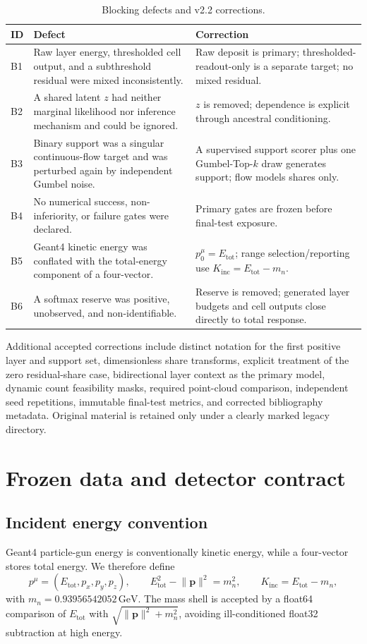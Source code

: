 \documentclass[10pt,a4paper]{article}
\newcommand{\pFour}{p^{\mu}}
\newcommand{\Kinc}{K_{\mathrm{inc}}}
\newcommand{\Etot}{E_{\mathrm{tot}}}
\newcommand{\GeV}{\,\mathrm{GeV}}
\begin{document}
\begin{table}[ht]
\centering
\caption{Blocking defects and v2.2 corrections.}
\label{tab:blockers}
\begin{tabularx}{\textwidth}{@{}p{}Y Y@{}}
\toprule
ID & Defect & Correction \\
\midrule
B1 & Raw layer energy, thresholded cell output, and a subthreshold residual were mixed inconsistently. & Raw deposit is primary; thresholded-readout-only is a separate target; no mixed residual. \\
B2 & A shared latent $z$ had neither marginal likelihood nor inference mechanism and could be ignored. & $z$ is removed; dependence is explicit through ancestral conditioning. \\
B3 & Binary support was a singular continuous-flow target and was perturbed again by independent Gumbel noise. & A supervised support scorer plus one Gumbel-Top-$k$ draw generates support; flow models shares only. \\
B4 & No numerical success, non-inferiority, or failure gates were declared. & Primary gates are frozen before final-test exposure. \\
B5 & Geant4 kinetic energy was conflated with the total-energy component of a four-vector. & $\pFour_0=\Etot$; range selection/reporting use $\Kinc=\Etot-m_n$. \\
B6 & A softmax reserve was positive, unobserved, and non-identifiable. & Reserve is removed; generated layer budgets and cell outputs close directly to total response. \\
\bottomrule
\end{tabularx}
\end{table}

Additional accepted corrections include distinct notation for the first positive layer and support set, dimensionless share transforms, explicit treatment of the zero residual-share case, bidirectional layer context as the primary model, dynamic count feasibility masks, required point-cloud comparison, independent seed repetitions, immutable final-test metrics, and corrected bibliography metadata. Original material is retained only under a clearly marked legacy directory.

\section{Frozen data and detector contract}

\subsection{Incident energy convention}
Geant4 particle-gun energy is conventionally kinetic energy, while a four-vector stores total energy. We therefore define
\begin{equation}
 \pFour=(\Etot,p_x,p_y,p_z),\qquad
 \Etot^2-\lVert\mathbf p\rVert^2=m_n^2,\qquad
 \Kinc=\Etot-m_n,
 \label{eq:energy}
\end{equation}
with $m_n=0.93956542052\GeV$. The mass shell is accepted by a float64 comparison of $\Etot$ with $\sqrt{\lVert\mathbf p\rVert^2+m_n^2}$, avoiding ill-conditioned float32 subtraction at high energy.
\end{document}

